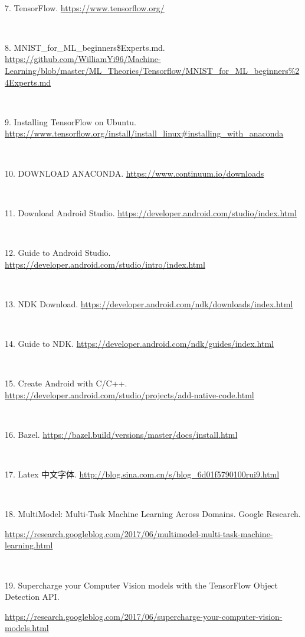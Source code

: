 \documentclass[UTF8, Microsoft YaHei]{book}
\begin{document}
    ~

    7. TensorFlow. \url{https://www.tensorflow.org/}

    ~

    8. MNIST\_for\_ML\_beginners\$Experts.md.  \url{https://github.com/WilliamYi96/Machine-Learning/blob/master/ML_Theories/Tensorflow/MNIST_for_ML_beginners%24Experts.md}

    ~

    9. Installing TensorFlow on Ubuntu.  \url{https://www.tensorflow.org/install/install_linux#installing_with_anaconda}

    ~

    10. DOWNLOAD ANACONDA. \url{https://www.continuum.io/downloads}

    ~

    11. Download Android Studio.  \url{https://developer.android.com/studio/index.html}

    ~

    12. Guide to Android Studio. \url{https://developer.android.com/studio/intro/index.html}

    ~

    13. NDK Download. \url{https://developer.android.com/ndk/downloads/index.html}

    ~

    14. Guide to NDK. \url{https://developer.android.com/ndk/guides/index.html}

    ~

    15. Create Android with C/C++. \url{https://developer.android.com/studio/projects/add-native-code.html}

    ~

    16. Bazel. \url{https://bazel.build/versions/master/docs/install.html}

    ~

    17. Latex 中文字体.  \url{http://blog.sina.com.cn/s/blog_6d01f5790100rui9.html}

    ~

    18. MultiModel: Multi-Task Machine Learning Across Domains. Google Research.

        \url{https://research.googleblog.com/2017/06/multimodel-multi-task-machine-learning.html}

    ~

    19. Supercharge your Computer Vision models with the TensorFlow Object Detection API.

        \url{https://research.googleblog.com/2017/06/supercharge-your-computer-vision-models.html}
\end{document}

